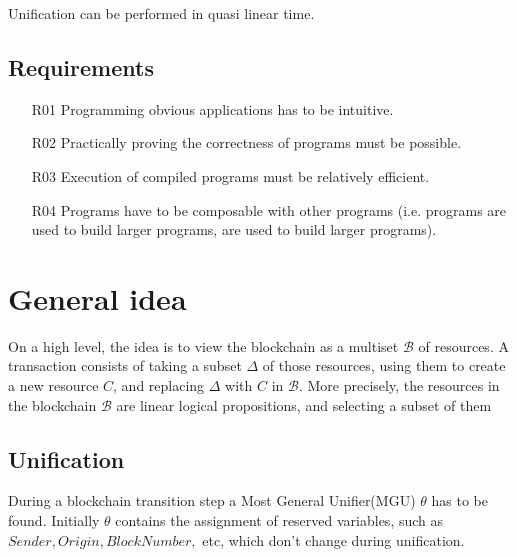\documentclass[sigconf]{acmart}
\begin{document}


Unification can be performed in quasi linear time\cite{Baader2001}.


\subsection{Requirements}

\begin{enumerate}
  \item[R01] Programming obvious applications has to be intuitive.
  \item[R02] Practically proving the correctness of programs must be possible.
  \item[R03] Execution of compiled programs must be relatively efficient.
  \item[R04] Programs have to be composable with other programs (i.e. programs are used to build larger programs, are used to build larger programs).
\end{enumerate}

\section{General idea}
On a high level, the idea is to view the blockchain as a multiset $\mathcal{B}$ of resources. A transaction consists of taking a subset $\Delta$ of those resources, using them to create a new resource $C$, and replacing $\Delta$ with $C$ in $\mathcal{B}$. More precisely, the resources in the blockchain $\mathcal{B}$ are linear logical propositions, and selecting a subset of them

\subsection{Unification}
During a blockchain transition step a Most General Unifier(MGU) $\theta$ has to be found. Initially $\theta$ contains the assignment of reserved variables, such as $Sender, Origin, BlockNumber, $ etc, which don't change during unification.
\end{document}
